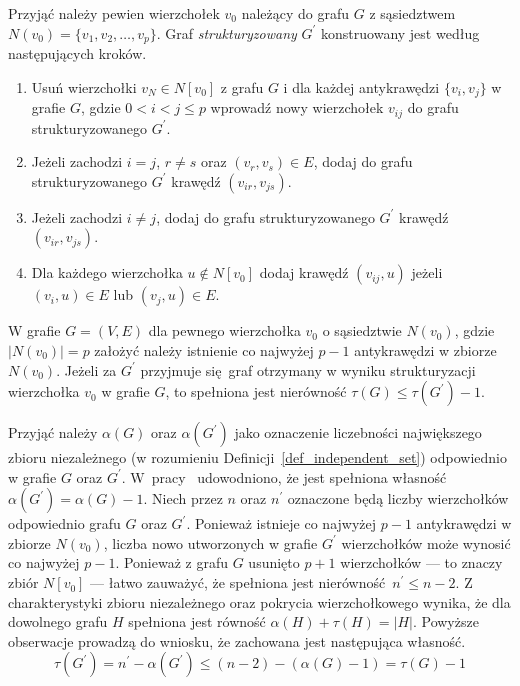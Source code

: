 {  Przyjąć należy pewien wierzchołek $v_0$ należący do grafu $G$ z sąsiedztwem $N(v_0)=\{v_1, v_2, \ldots, v_p\}$.
  Graf \emph{strukturyzowany} $G^\prime$ konstruowany jest według następujących kroków.
  \begin{enumerate}
    \item Usuń wierzchołki $v_N \in N[v_0]$ z grafu $G$ i dla każdej antykrawędzi $\{v_i, v_j\}$ w grafie $G$, gdzie $0 < i < j \leq p$ wprowadź nowy wierzchołek $v_{ij}$ do grafu strukturyzowanego $G^\prime$.
    \item Jeżeli zachodzi $i=j$, $r\neq s$ oraz $(v_r, v_s) \in E$, dodaj do grafu strukturyzowanego $G^\prime$ krawędź $(v_{ir}, v_{js})$.
    \item Jeżeli zachodzi $i \neq j$, dodaj do grafu strukturyzowanego $G^\prime$ krawędź $(v_{ir}, v_{js})$.
    \item Dla każdego wierzchołka $u \notin N[v_0]$ dodaj krawędź $(v_{ij}, u)$ jeżeli $(v_i, u) \in E$ lub $(v_j, u) \in E$.
  \end{enumerate}
  \begin{theorem}
    W grafie $G=(V, E)$ dla pewnego wierzchołka $v_0$ o sąsiedztwie $N(v_0)$, gdzie $|N(v_0)|=p$ założyć należy istnienie co najwyżej $p-1$ antykrawędzi w zbiorze $N(v_0)$.
    Jeżeli za $G^\prime$ przyjmuje się graf otrzymany w wyniku strukturyzacji wierzchołka $v_0$ w grafie $G$, to spełniona jest nierówność $\tau(G) \leq \tau(G^\prime) - 1$.
  \end{theorem}
  \begin{bproof}
    Przyjąć należy $\alpha(G)$ oraz $\alpha(G^\prime)$ jako oznaczenie liczebności największego zbioru niezależnego (w rozumieniu Definicji~\ref{def_independent_set}) odpowiednio w grafie $G$ oraz $G^\prime$.
    W~pracy~\cite{Ebengger:1984} udowodniono, że jest spełniona własność $\alpha(G^\prime)=\alpha(G) - 1$.
    Niech przez $n$ oraz $n^\prime$ oznaczone będą liczby wierzchołków odpowiednio grafu $G$ oraz $G^\prime$.
    Ponieważ istnieje co najwyżej $p - 1$ antykrawędzi w zbiorze $N(v_0)$, liczba nowo utworzonych w grafie $G^\prime$ wierzchołków może wynosić co najwyżej $p - 1$.
    Ponieważ z grafu $G$ usunięto $p+1$ wierzchołków --- to znaczy zbiór $N[v_0]$ --- łatwo zauważyć, że spełniona jest nierówność $n^\prime \leq n-2$.
    Z charakterystyki zbioru niezależnego oraz pokrycia wierzchołkowego wynika, że dla dowolnego grafu $H$ spełniona jest równość $\alpha(H)+\tau(H)=|H|$.
    Powyższe obserwacje prowadzą do wniosku, że zachowana jest następująca własność.
    \[\tau(G^\prime)=n^\prime-\alpha(G^\prime)\leq (n-2)-(\alpha(G)-1)=\tau(G)-1\]
  \end{bproof}
}
